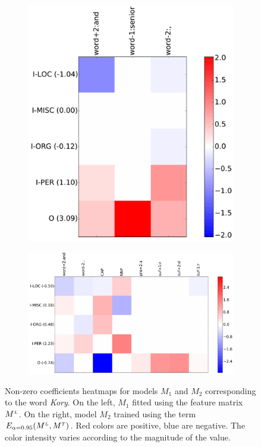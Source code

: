 \begin{figure}[h!]
	\centering
	
	\begin{subfigure}[t]{.5\textwidth}
	\centering
	\captionsetup{width=0.7\textwidth}
	\includegraphics[width=0.9\linewidth]{images/Chapitre4/M1_383.pdf}
	\label{fig:trans_M1}
	\end{subfigure}%
	\begin{subfigure}[t]{.5\textwidth}
	\centering
	\captionsetup{width=0.7\textwidth}
	\includegraphics[width=0.9\linewidth]{images/Chapitre4/M2_383.pdf}
	\label{fig:trans_M2}	
	\end{subfigure}
	\caption{Non-zero coefficients heatmaps for models  $M_1$ and $M_2$ corresponding to the word \textit{Kory}. On the left, $M_1$ fitted using the feature matrix $M^{\scriptscriptstyle L}$. On the right, model $M_2$ trained using the term $E_{\alpha=0.95}(M^{\scriptscriptstyle L}, M^{\scriptscriptstyle T})$. Red colors are positive, blue are negative. The color intensity varies according to the magnitude of the value.}
	\label{fig:trans_M1_M2}
\end{figure}

